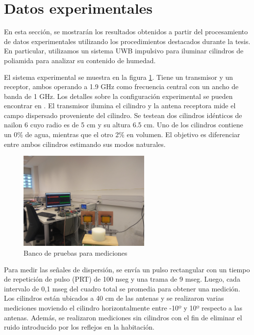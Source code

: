 \section{Datos experimentales}

	En esta sección, se mostrarán los resultados obtenidos a partir del procesamiento de datos experimentales utilizando los  procedimientos destacados durante la tesis. En particular, utilizamos un sistema UWB impulsivo para iluminar cilindros de poliamida para analizar su contenido de humedad.
	
	El sistema experimental se muestra en la figura \ref{Fig:testbed}. Tiene un transmisor y un receptor, ambos operando a 1.9 GHz como frecuencia central con un ancho de banda de 1 GHz. Los detalles sobre la configuración experimental se pueden encontrar en \cite{Altieri2020}. El transmisor ilumina el cilindro y la antena receptora mide el campo dispersado proveniente del cilindro. Se testean dos cilindros idénticos de nailon 6 cuyo radio es de 5 cm y su altura 6.5 cm. Uno de los cilindros contiene un 0\%  de agua, mientras que el otro 2\% en volumen. El objetivo es diferenciar entre ambos cilindros estimando sus modos naturales.
	
	\begin{figure}[ht]
		\centerline{\includegraphics[width=6.5cm]{Figuras/testbed.jpg}}
		\caption{Banco de pruebas para mediciones}
		\label{Fig:testbed}
	\end{figure}
	
	Para medir las señales de dispersión, se envía un pulso rectangular con un tiempo de repetición de pulso (PRT) de 100 nseg y una trama de 9 mseg. Luego, cada intervalo de 0,1 mseg del cuadro total se promedia para obtener una medición. Los cilindros están ubicados a 40 cm de las antenas y se realizaron varias mediciones moviendo el cilindro horizontalmente entre -10º y 10º respecto a las antenas. Además, se realizaron mediciones sin cilindros con el fin de eliminar el ruido introducido por los reflejos en la habitación.
	
